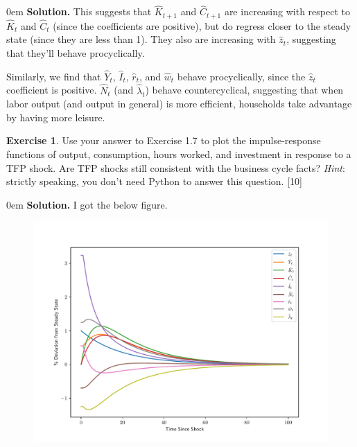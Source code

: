 \documentclass[11pt]{article}
\numberwithin{equation}{section} %
\numberwithin{figure}{section} %
\numberwithin{table}{section} %
\theoremstyle{definition}
\newtheorem{exercise}[theorem]{Exercise}
\newenvironment{solution}{\begin{addmargin}[2em]{0em} {\bf Solution. }}{\end{addmargin}}
\begin{document}
\begin{solution}
    This suggests that $\hat{K}_{t+1}$ and $\hat{C}_{t+1}$ are increasing with respect to $\hat{K}_t$ and $\hat{C}_t$ (since the coefficients are positive), but do regress closer to the steady state (since they are less than 1). They also are increasing with $\hat{z}_t$, suggesting that they'll behave procyclically.

    Similarly, we find that $\hat{Y}_t$, $\hat{I}_t$, $\hat{r}_t$, and $\hat{w}_t$ behave procyclically, since the $\hat{z}_t$ coefficient is positive. $\hat{N}_t$ (and $\hat{\lambda}_t$) behave countercyclical, suggesting that when labor output (and output in general) is more efficient, households take advantage by having more leisure.
\end{solution}


\begin{exercise}
    Use your answer to Exercise 1.7 to plot the impulse-response functions of output, consumption, hours worked, and investment in response to a TFP shock. Are TFP shocks still consistent with the business cycle facts? \emph{Hint}: strictly speaking, you don't need Python to answer this question. [10]
\end{exercise}

\begin{solution}
    I got the below figure.

    \begin{figure}[H]
        \centering
        \includegraphics[width=\textwidth]{graphs/nu=0.85.pdf}
    \end{figure}
\end{solution}
\end{document}
